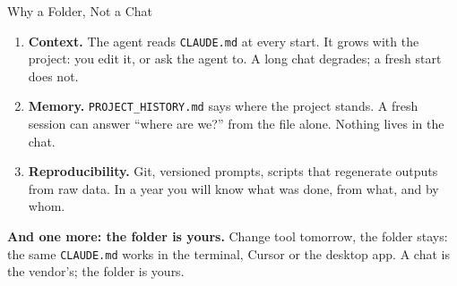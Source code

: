 \documentclass[svgnames,x11names,dvipsnames]{beamer}
\begin{document}
\begin{frame}{Why a Folder, Not a Chat}

\begin{enumerate}
    \item \textbf{Context.} The agent reads \texttt{CLAUDE.md} at every start. It grows with the project: you edit it, or ask the agent to. A long chat degrades; a fresh start does not.
    \vspace{0.2cm}
    \item \textbf{Memory.} \texttt{PROJECT\_HISTORY.md} says where the project stands. A fresh session can answer ``where are we?'' from the file alone. Nothing lives in the chat.
    \vspace{0.2cm}
    \item \textbf{Reproducibility.} Git, versioned prompts, scripts that regenerate outputs from raw data. In a year you will know what was done, from what, and by whom.
\end{enumerate}

\vspace{0.4cm}

\textbf{And one more: the folder is yours.}
Change tool tomorrow, the folder stays: the same \texttt{CLAUDE.md} works in the terminal, Cursor or the desktop app. A chat is the vendor's; the folder is yours.

\end{frame}
\end{document}
